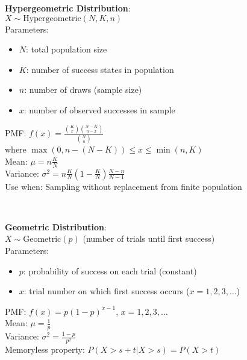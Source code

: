 \documentclass{article}
\newenvironment{cheatformula}[1][Title]{
    \begin{minipage}{\linewidth}
    \textbf{#1}:\\
}{
    \end{minipage}\\[2ex]
}
\begin{document}
\begin{multicols*}{2}
\begin{cheatformula}[Hypergeometric Distribution]
    $X \sim \text{Hypergeometric}(N,K,n)$\\
    Parameters:
    \begin{itemize}
        \item $N$: total population size
        \item $K$: number of success states in population
        \item $n$: number of draws (sample size)
        \item $x$: number of observed successes in sample
    \end{itemize}
    PMF: $f(x) = \frac{\binom{K}{x}\binom{N-K}{n-x}}{\binom{N}{n}}$\\
    where $\max(0, n-(N-K)) \leq x \leq \min(n,K)$\\
    
    Mean: $\mu = n\frac{K}{N}$\\
    Variance: $\sigma^2 = n\frac{K}{N}\left(1-\frac{K}{N}\right)\frac{N-n}{N-1}$\\
    
    Use when: Sampling without replacement from finite population
\end{cheatformula}

\begin{cheatformula}[Geometric Distribution]
    $X \sim \text{Geometric}(p)$ (number of trials until first success)\\
    Parameters:
    \begin{itemize}
        \item $p$: probability of success on each trial (constant)
        \item $x$: trial number on which first success occurs ($x = 1,2,3,\ldots$)
    \end{itemize}
    PMF: $f(x) = p(1-p)^{x-1}$, $x = 1,2,3,\ldots$\\
    Mean: $\mu = \frac{1}{p}$\\
    Variance: $\sigma^2 = \frac{1-p}{p^2}$\\
    
    Memoryless property: $P(X > s+t | X > s) = P(X > t)$
\end{cheatformula}


\end{multicols*}
\end{document}
